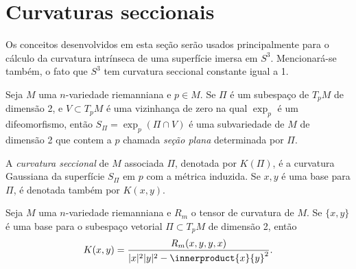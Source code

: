 \section{Curvaturas seccionais}

Os conceitos desenvolvidos em esta seção serão usados principalmente para o cálculo da curvatura intrínseca de uma superfície imersa em $S^3$.
Mencionará-se também, o fato que $S^3$ tem curvatura seccional constante igual a 1.

\begin{definicao}
	Seja $M$ uma $n$-variedade riemanniana e $p \in M$. Se $\Pi$ é um subespaço de $T_p M$ de dimensão 2, e $V \subset T_p M$ é uma vizinhança de zero  na qual $\exp_p$ é um difeomorfismo, então $S_{\Pi} = \exp_p(\Pi \cap V)$ é uma subvariedade de $M$ de dimensão 2 que contem a  $p$ chamada \emph{seção plana} determinada por $\Pi$.
\end{definicao}

\begin{definicao}
	A \emph{curvatura seccional} de $M$ associada $\Pi$, denotada por $K(\Pi)$, é a curvatura Gaussiana da superfície $S_{\Pi}$ em $p$ com a métrica induzida. Se $x,y$ é uma base para $\Pi$, é denotada também por $K(x,y)$.
\end{definicao}

\begin{proposicao}
	Seja $M$ uma $n$-variedade riemanniana e
	$R_m$ o tensor de curvatura de $M$.
	Se $\{ x,y \}$ é uma base para o subespaço vetorial $\Pi \subset T_p M$ de dimensão 2, então
	\begin{equation*}
	K(x,y) = \frac{R_m(x,y,y,x)}{|x|^2 |y|^2 - \innerproduct{x}{y}^2}.
	\end{equation*}
\end{proposicao}

